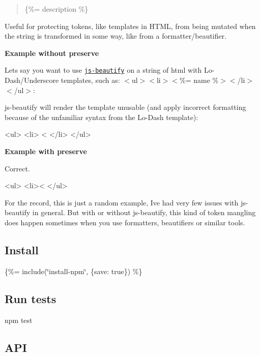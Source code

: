 \begin{quote}
\{\%= description \%\} \end{quote}


Useful for protecting tokens, like templates in H\+T\+ML, from being mutated when the string is transformed in some way, like from a formatter/beautifier.

{\bfseries Example without {\ttfamily preserve}}

Let\textquotesingle{}s say you want to use \href{https://github.com/beautify-web/js-beautify}{\tt js-\/beautify} on a string of html with Lo-\/\+Dash/\+Underscore templates, such as\+: {\ttfamily $<$ul$>$$<$li$>$$<$\%= name \%$>$$<$/li$>$$<$/ul$>$}\+:

js-\/beautify will render the template unusable (and apply incorrect formatting because of the unfamiliar syntax from the Lo-\/\+Dash template)\+:


\begin{DoxyCode}
<ul>
  <li>
    <%
  </li>
</ul>
\end{DoxyCode}


{\bfseries Example with {\ttfamily preserve}}

Correct.


\begin{DoxyCode}
<ul>
  <li><%
</ul>
\end{DoxyCode}


For the record, this is just a random example, I\textquotesingle{}ve had very few issues with js-\/beautify in general. But with or without js-\/beautify, this kind of token mangling does happen sometimes when you use formatters, beautifiers or similar tools.

\subsection*{Install}

\{\%= include(\char`\"{}install-\/npm\char`\"{}, \{save\+: true\}) \%\}

\subsection*{Run tests}


\begin{DoxyCode}
npm test
\end{DoxyCode}


\subsection*{A\+PI}

